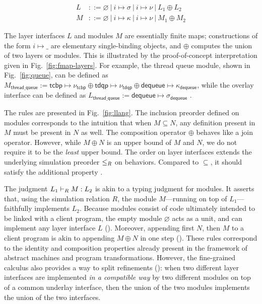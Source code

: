 \begin{small}
\vspace*{-2ex}
\begin{align*}
    L &::= \varnothing
            \ |\ i \mapsto \sigma
            \ |\ i \mapsto \nu
            \ |\ L_1 \oplus L_2 \\
    M &::= \varnothing
            \ |\ i \mapsto \kappa
            \ |\ i \mapsto \nu
            \ |\ M_1 \oplus M_2
\end{align*}
\vspace*{-2ex}
\end{small}

\noindent{}The layer interfaces $L$ and modules $M$
are essentially finite maps;
constructions of the form $i \mapsto \_$
are elementary single-binding objects,
and $\oplus$ computes
the union of two layers or modules.
This is illustrated by the proof-of-concept
interpretation given in 
Fig.~\ref{fig:fmap-layers}.
For example, the thread queue module, shown in Fig.~\ref{fig:queue},
can be defined as 
$M_\textsf{thread\_queue}:=\textsf{tcbp}\mapsto \nu_\textsf{tcbp} 
\oplus \textsf{tdqp}\mapsto \nu_\textsf{tdqp}
\oplus \textsf{dequeue}\mapsto \kappa_\textsf{dequeue}$,
while the overlay interface can be defined as 
$L_\textsf{thread\_queue}:= \textsf{dequeue}\mapsto \sigma_\textsf{dequeue}$ .

The rules are presented in Fig.~\ref{fig:llang}.
The inclusion preorder defined on modules
corresponds to the intuition that when $M \subseteq N$,
any definition present in $M$ must be present in $N$ as well.
The composition operator $\oplus$
behaves like a join operator.
However, while $M \oplus N$ is an upper bound of $M$ and $N$,
we do not require it to be the \emph{least} upper bound.
The order on layer interfaces
extends the underlying simulation preorder $\le_{R}$ on behaviors.
Compared to $\subseteq$, it should satisfy
the additional property .

The judgment $L_1 \vdash_{R} M : L_2$ is akin to a typing judgment for
modules. It asserts that, using the simulation relation $R$, the
module $M$---running on top of $L_1$---faithfully implements $L_2$.
Because modules consist of code ultimately intended to be linked
with a client program, the empty module $\varnothing$ acts as a
unit, and can implement any layer interface $L$ 
().  Moreover, appending first $N$, then $M$ to a
client program is akin to appending $M \oplus N$ in one step
().  These rules correspond to the identity and
composition properties already present in the framework of abstract
machines and program transformations.  However, the fine-grained
calculus also provides a way to split refinements ():
when two different layer interfaces are implemented \emph{in a
  compatible way} by two different modules on top of a common underlay
interface, then the union of the two modules implements the union of
the two interfaces.

